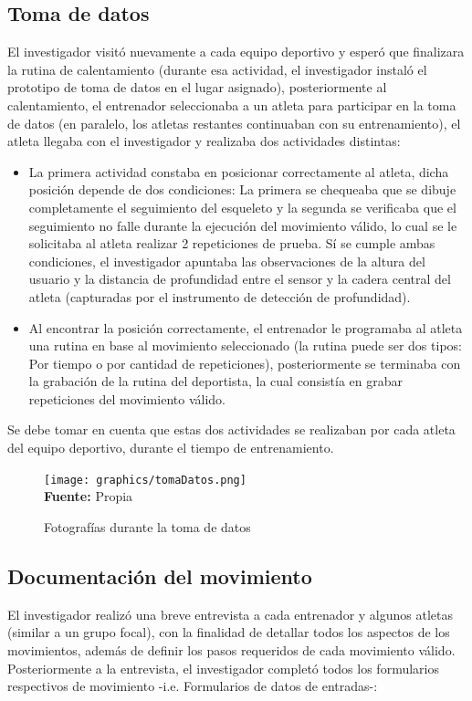 \subsection{Toma de datos}
El investigador visit\'o nuevamente a cada equipo deportivo y esper\'o que finalizara la rutina de calentamiento (durante esa actividad, el investigador instal\'o el prototipo de toma de datos en el lugar asignado), posteriormente al calentamiento, el entrenador seleccionaba a un atleta para participar en la toma de datos (en paralelo, los atletas restantes continuaban con su entrenamiento), el atleta llegaba con el investigador y realizaba dos actividades distintas:
\begin{itemize}
\item La primera actividad constaba en posicionar correctamente al atleta, dicha posici\'on depende de dos condiciones: La primera se chequeaba que se dibuje completamente el seguimiento del esqueleto y la segunda se verificaba que el seguimiento no falle durante la ejecuci\'on del movimiento v\'alido, lo cual se le solicitaba al atleta realizar 2 repeticiones de prueba. S\'i se cumple ambas condiciones, el investigador apuntaba las observaciones de la altura del usuario y la distancia de profundidad entre el sensor y la cadera central del atleta (capturadas por el instrumento de detecci\'on de profundidad).
\item Al encontrar la posici\'on correctamente, el entrenador le programaba al atleta una rutina en base al movimiento seleccionado (la rutina puede ser dos tipos: Por tiempo o por cantidad de repeticiones), posteriormente se terminaba con la grabaci\'on de la rutina del deportista, la cual consist\'ia en grabar repeticiones del movimiento v\'alido.
\end{itemize}
Se debe tomar en cuenta que estas dos actividades se realizaban por cada atleta del equipo deportivo, durante el tiempo de entrenamiento.
 \begin{figure}[H]
	\caption{Fotograf\'ias durante la toma de datos}
	\label{fig:getDataStep}
	\centering
	\texttt{[image: graphics/tomaDatos.png]} \\
	\textbf{Fuente:} Propia
\end{figure} 
\subsection{Documentaci\'on del movimiento}
El investigador realiz\'o una breve entrevista a cada entrenador y algunos atletas (similar a un grupo focal), con la finalidad de detallar todos los aspectos de los movimientos, adem\'as de definir los pasos requeridos de cada movimiento v\'alido. Posteriormente a la entrevista, el investigador complet\'o todos los formularios respectivos de movimiento -i.e. Formularios de datos de entradas-:
